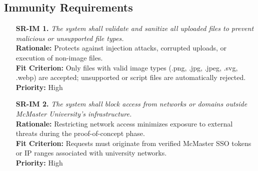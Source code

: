 \documentclass[12pt]{article}
\begin{document}
\subsection{Immunity Requirements}
\begin{itemize}
  \item[\textbf{SR-IM 1.}] \textit{The system shall validate and
      sanitize all uploaded files to prevent malicious or unsupported
    file types.}\\
    \textbf{Rationale:} Protects against injection attacks, corrupted
    uploads, or execution of non-image files.\\
    \textbf{Fit Criterion:} Only files with valid image types (.png,
    .jpg, .jpeg, .svg, .webp) are accepted; unsupported or script
    files are automatically rejected.\\
    \textbf{Priority:} High

  \item[\textbf{SR-IM 2.}] \textit{The system shall block access from
    networks or domains outside McMaster University’s infrastructure.}\\
    \textbf{Rationale:} Restricting network access minimizes exposure
    to external threats during the proof-of-concept phase.\\
    \textbf{Fit Criterion:} Requests must originate from verified
    McMaster SSO tokens or IP ranges associated with university networks.\\
    \textbf{Priority:} High
\end{itemize}
\end{document}
